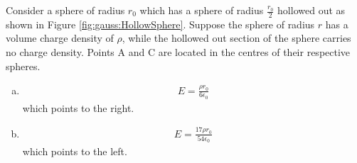 \question Consider a sphere of radius $r_0$ which has a sphere of radius $\frac{r_0}{2}$ hollowed out as shown in Figure \ref{fig:gauss:HollowSphere}. Suppose the sphere of radius $r$ has a volume charge density of $\rho$, while the hollowed out section of the sphere carries no charge density. Points A and C are located in the centres of their respective spheres.
\begin{finalanswer}
\begin{enumerate}[(a)]
\item \begin{align*}
E=\frac{\rho r_0}{6\epsilon_0}
\end{align*} which points to the right.
\item \begin{align*}
E=\frac{17\rho r_0}{54\epsilon_0}
\end{align*} 
which points to the left.
\end{enumerate}
\end{finalanswer}
